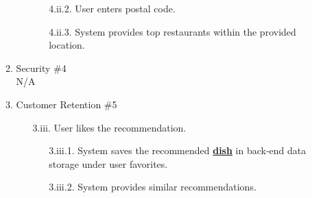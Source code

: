 \documentclass[]{article}
\begin{document}
\begin{enumerate}[{\bf BE1.}]
\begin{enumerate}[{\bf VP1.}]
\begin{enumerate}
\begin{enumerate}
							\item[4.ii.2.] User enters postal code.
							\item[4.ii.3.] System provides top restaurants within the provided location.
						\end{enumerate}
					\end{enumerate}
				\item Security \#4 \\
					N/A
				\item Customer Retention \#5
					\begin{enumerate}
						\item[3.iii.] User likes the recommendation.
						\begin{enumerate}
							\item[3.iii.1.] System saves the recommended \hyperref[Dish]{\textbf{dish}} in back-end data storage under user favorites.
							\item[3.iii.2.] System provides similar recommendations.
						\end{enumerate}
					\end{enumerate}
			\end{enumerate}
	

\end{enumerate}
\end{document}
